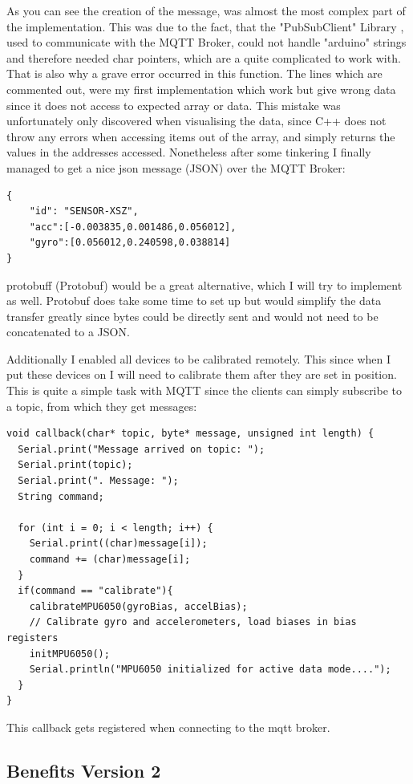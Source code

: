 As you can see the creation of the message, was almost the most complex part of the implementation. This was due to the fact, that the "PubSubClient" Library \cite{knollear26:online}, used to communicate with the MQTT Broker, could not handle "arduino" strings and therefore needed char pointers, which are a quite complicated to work with. That is also why a grave error occurred in this function. The lines which are commented out, were my first implementation which work but give wrong data since it does not access to expected array or data.
This mistake was unfortunately only discovered when visualising the data, since C++ does not throw any errors when accessing items out of the array, and simply returns the values in the addresses accessed.
Nonetheless after some tinkering I finally managed to get a nice \acrshort{json} message (\gls{JSON}) over the MQTT Broker: 
\begin{lstlisting}
{ 
    "id": "SENSOR-XSZ", 
    "acc":[-0.003835,0.001486,0.056012],
    "gyro":[0.056012,0.240598,0.038814]
}
\end{lstlisting}

\acrshort{protobuff} (\gls{Protobuf}) would be a great alternative, which I will try to implement as well. Protobuf does take some time to set up but would simplify the data transfer greatly since bytes could be directly sent and would not need to be concatenated to a JSON.

Additionally I enabled all devices to be calibrated remotely. This since when I put these devices on I will need to calibrate them after they are set in position. This is quite a simple task with MQTT since the clients can simply subscribe to a topic, from which they get messages: 

\begin{lstlisting}
void callback(char* topic, byte* message, unsigned int length) {
  Serial.print("Message arrived on topic: ");
  Serial.print(topic);
  Serial.print(". Message: ");
  String command;
  
  for (int i = 0; i < length; i++) {
    Serial.print((char)message[i]);
    command += (char)message[i];
  }
  if(command == "calibrate"){
    calibrateMPU6050(gyroBias, accelBias); 
    // Calibrate gyro and accelerometers, load biases in bias registers  
    initMPU6050(); 
    Serial.println("MPU6050 initialized for active data mode....");
  }
}
\end{lstlisting}
This callback gets registered when connecting to the mqtt broker.

\subsection{Benefits Version 2}

